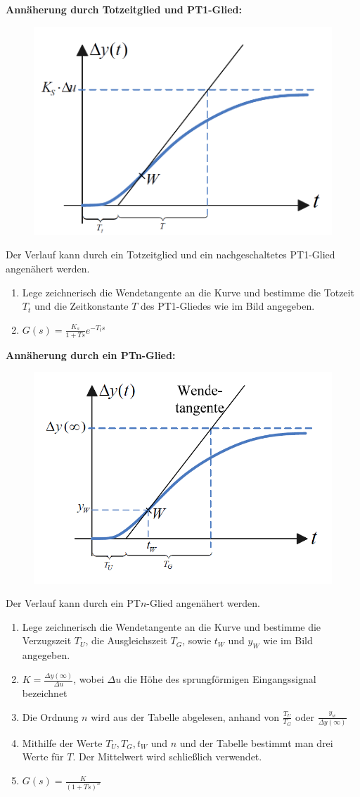 \documentclass[10pt,a4paper]{article}
\begin{document}
\textbf{Annäherung durch Totzeitglied und PT1-Glied:} \\
\begin{figure}[H]
	\includegraphics[width = 0.4\columnwidth]{imgs/modellidentifikation_1.png}
\end{figure}
Der Verlauf kann durch ein Totzeitglied und ein nachgeschaltetes PT1-Glied angenähert werden.
\begin{enumerate}
	\item Lege zeichnerisch die Wendetangente an die Kurve und bestimme die Totzeit $T_t$ und die Zeitkonstante $T$ des PT1-Gliedes wie im Bild angegeben.
	\item $G(s) = \frac{K_s}{1 + Ts} e^{-T_ts}$
\end{enumerate}

\textbf{Annäherung durch ein PTn-Glied:} \\
\begin{figure}[H]
	\includegraphics[width = 0.4\columnwidth]{imgs/modellidentifikation_2.png}
\end{figure}
Der Verlauf kann durch ein PT$n$-Glied angenähert werden.
\begin{enumerate}
	\item Lege zeichnerisch die Wendetangente an die Kurve und bestimme die Verzugszeit $T_U$, die Ausgleichszeit $T_G$, sowie $t_W$ und $y_W$ wie im Bild angegeben.
	\item $K = \frac{\Delta y(∞)}{\Delta u}$, wobei $\Delta u$ die Höhe des sprungförmigen Eingangssignal bezeichnet
	\item Die Ordnung $n$ wird aus der Tabelle abgelesen, anhand von $\frac{T_U}{T_G}$ oder $\frac{y_w}{\Delta y(∞)}$
	\item Mithilfe der Werte $T_U, T_G, t_W$ und $n$ und der Tabelle bestimmt man drei Werte für $T$. Der Mittelwert wird schließlich verwendet.	
	\item $G(s) = \frac{K}{(1 + Ts)^n}$
\end{enumerate}
\end{document}
